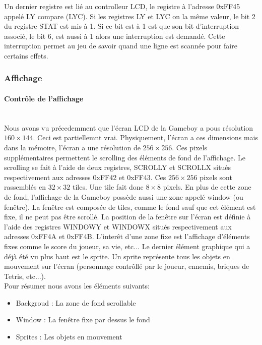 \documentclass[a4paper]{article}
\begin{document}
Un dernier registre est lié au controlleur LCD, le registre à l'adresse 0xFF45
appelé LY compare (LYC). Si les registres LY et LYC on la même valeur, le bit 2
du registre STAT est mis à 1. Si ce bit est à 1 est que son bit d'interruption associé,
le bit 6, est aussi à 1 alors une interruption est demandé. Cette interruption
permet au jeu de savoir quand une ligne est scannée pour faire certains effets.

\subsubsection{Affichage}
\paragraph{Contrôle de l'affichage} \mbox{} \\

Nous avons vu précedemment que l'écran LCD de la Gameboy a pous résolution
$160 \times 144$. Ceci est partiellemnt vrai. Physiquement, l'écran a ces dimensions
mais dans la mémoire, l'écran a une résolution de $256 \times 256$. Ces pixels
supplémentaires permettent le scrolling des éléments de fond de l'affichage. Le
scrolling se fait à l'aide de deux registres, SCROLLY et SCROLLX situés respectivement
aux adresses 0xFF42 et 0xFF43. Ces $256 \times 256$ pixels sont rassemblés en $32 \times 32$ tiles.
Une tile fait donc $8 \times 8$ pixels. En plus de cette zone de fond, l'affichage de la
Gameboy possède aussi une zone appelé window (ou fenêtre). La fenêtre est composée
de tiles, comme le fond sauf que cet élément est fixe, il ne peut pas être scrollé.
La position de la fenêtre sur l'écran est définie à l'aide des registres WINDOWY
et WINDOWX situés respectivement aux adresses 0xFF4A et 0xFF4B.
L'interêt d'une zone fixe est l'affichage d'éléments fixes comme le score du joueur,
sa vie, etc... Le dernier élément graphique qui a déjà été vu plus haut est le sprite.
Un sprite représente tous les objets en mouvement sur l'écran (personnage contrôllé par
le joueur, ennemis, briques de Tetris, etc...). \\

Pour résumer nous avons les éléments suivants:
\begin{itemize}[label=\textbullet]
	\item Backgroud : La zone de fond scrollable
	\item Window : La fenêtre fixe par dessus le fond
	\item Sprites : Les objets en mouvement
\end{itemize} \bigbreak
\end{document}
